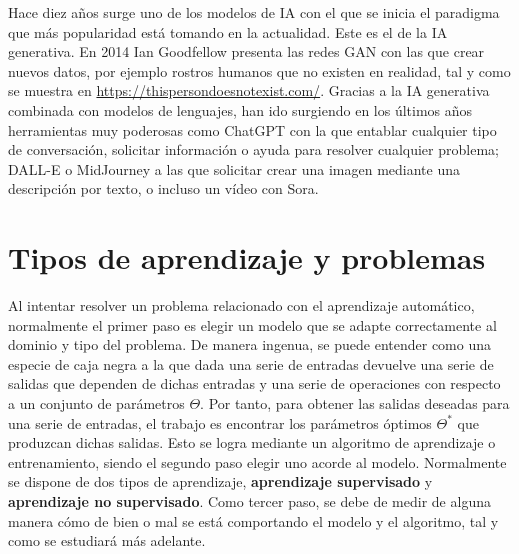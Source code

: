 		Hace diez años surge uno de los modelos de IA con el que se inicia el paradigma que más popularidad está tomando en la actualidad. Este es el de la IA generativa. En 2014 Ian Goodfellow presenta las redes GAN con las que crear nuevos datos, por ejemplo rostros humanos que no existen en realidad, tal y como se muestra en \url{https://thispersondoesnotexist.com/}. Gracias a la IA generativa combinada con modelos de lenguajes, han ido surgiendo en los últimos años herramientas muy poderosas como ChatGPT con la que entablar cualquier tipo de conversación, solicitar información o ayuda para resolver cualquier problema; DALL-E o MidJourney a las que solicitar crear una imagen mediante una descripción por texto, o incluso un vídeo con Sora. 

	\section{Tipos de aprendizaje y problemas}
	
		Al intentar resolver un problema relacionado con el aprendizaje automático, normalmente el primer paso es elegir un modelo que se adapte correctamente al dominio y tipo del problema. De manera ingenua, se puede entender como una especie de caja negra a la que dada una serie de entradas devuelve una serie de salidas que dependen de dichas entradas y una serie de operaciones con respecto a un conjunto de parámetros $\Theta$. Por tanto, para obtener las salidas deseadas para una serie de entradas, el trabajo es encontrar los parámetros óptimos $\Theta^*$ que produzcan dichas salidas. Esto se logra mediante un algoritmo de aprendizaje o entrenamiento, siendo el segundo paso elegir uno acorde al modelo. Normalmente se dispone de dos tipos de aprendizaje, \textbf{aprendizaje supervisado} y \textbf{aprendizaje no supervisado}. Como tercer paso, se debe de medir de alguna manera cómo de bien o mal se está comportando el modelo y el algoritmo, tal y como se estudiará más adelante\cite{Szeliski}. \\
		
